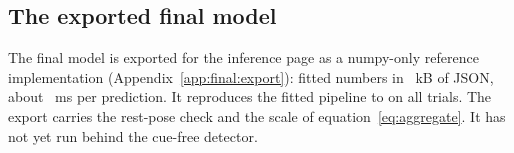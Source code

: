 \subsection{The exported final model}\label{sec:production:export}
The final model is exported for the inference page as a numpy-only reference implementation
(Appendix~\ref{app:final:export}):  fitted numbers in ~kB of JSON, about
~ms per prediction. It reproduces the fitted pipeline to  on all
 trials. The export carries the rest-pose check and the scale \tauk{} of
equation~\eqref{eq:aggregate}. It has not yet run behind the cue-free detector.
